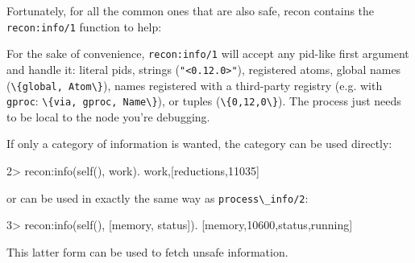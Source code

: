 \documentclass[11pt, oneside]{book}   	%
\newcommand{\otpapp}[1]{\Verb`#1`}
\newcommand{\function}[1]{\Verb`#1`}
\newcommand{\expression}[1]{\Verb`#1`}
\begin{document}
Fortunately, for all the common ones that are also safe, recon contains the \expression{recon:info/1} function to help:


For the sake of convenience, \expression{recon:info/1} will accept any pid-like first argument and handle it: literal pids, strings (\expression{"<0.12.0>"}), registered atoms, global names (\expression{\{global, Atom\}}), names registered with a third-party registry (e.g. with \otpapp{gproc}: \expression{\{via, gproc, Name\}}), or tuples (\expression{\{0,12,0\}}). The process just needs to be local to the node you're debugging.

If only a category of information is wanted, the category can be used directly:

\begin{VerbatimEshell}
2> recon:info(self(), work).
{work,[{reductions,11035}]}
\end{VerbatimEshell}

or can be used in exactly the same way as \function{process\_info/2}:

\begin{VerbatimEshell}
3> recon:info(self(), [memory, status]).
[{memory,10600},{status,running}]
\end{VerbatimEshell}

This latter form can be used to fetch unsafe information.
\end{document}
